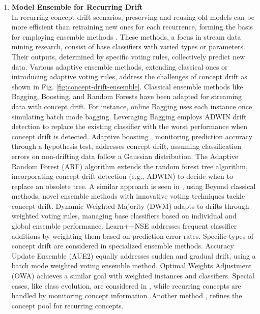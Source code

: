\begin{enumerate}[label=\Alph*.]
\item \textbf{Model Ensemble for Recurring Drift} \\
In recurring concept drift scenarios, preserving and reusing old models can be more efficient than retraining new ones for each recurrence, forming the basis for employing ensemble methods \cite{sun2018concept}. These methods, a focus in stream data mining research, consist of base classifiers with varied types or parameters. Their outputs, determined by specific voting rules, collectively predict new data. Various adaptive ensemble methods, extending classical ones or introducing adaptive voting rules, address the challenges of concept drift as shown in Fig. \ref{fig:concept-drift-ensemble}.
Classical ensemble methods like Bagging, Boosting, and Random Forests have been adapted for streaming data with concept drift. For instance, online Bagging \cite{oza2001experimental} uses each instance once, simulating batch mode bagging. Leveraging Bagging \cite{bifet2009new} employs ADWIN drift detection to replace the existing classifier with the worst performance when concept drift is detected.
 Adaptive boosting \cite{chu2004fast}, monitoring prediction accuracy through a hypothesis test, addresses concept drift, assuming classification errors on non-drifting data follow a Gaussian distribution. The Adaptive Random Forest (ARF) algorithm \cite{gomes2017adaptive} extends the random forest tree algorithm, incorporating concept drift detection (e.g., ADWIN) to decide when to replace an obsolete tree. A similar approach is seen in \cite{li2015learning}, using Beyond classical methods, novel ensemble methods with innovative voting techniques tackle concept drift. Dynamic Weighted Majority (DWM) \cite{kolter2007dynamic} adapts to drifts through weighted voting rules, managing base classifiers based on individual and global ensemble performance. Learn++NSE \cite{elwell2011incremental} addresses frequent classifier additions by weighting them based on prediction error rates.
 Specific types of concept drift are considered in specialized ensemble methods. Accuracy Update Ensemble (AUE2) \cite{brzezinski2013reacting} equally addresses sudden and gradual drift, using a batch mode weighted voting ensemble method. Optimal Weights Adjustment (OWA) \cite{zhang2008categorizing} achieves a similar goal with weighted instances and classifiers. Special cases, like class evolution, are considered in \cite{sun2016online}, while recurring concepts are handled by monitoring concept information \cite{gomes2013mining} \cite{gama2014survey} .Another method \cite{ahmadi2018modeling}, refines the concept pool for recurring concepts.
 

\end{enumerate}
